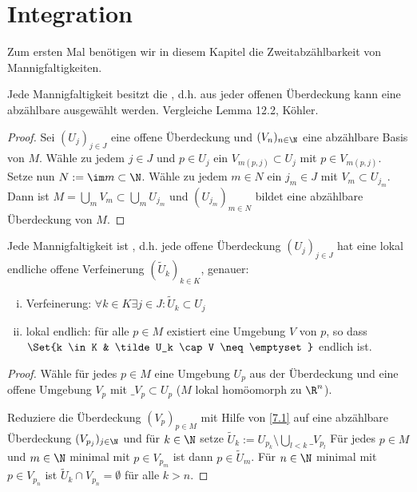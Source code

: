 \chapter{Integration}



Zum ersten Mal benötigen wir in diesem Kapitel die Zweitabzählbarkeit von Mannigfaltigkeiten.

\begin{lem} \label{7.1}
    Jede Mannigfaltigkeit besitzt die , d.h. aus jeder offenen Überdeckung kann eine abzählbare ausgewählt werden.
    Vergleiche Lemma 12.2, Köhler.
    \begin{proof}
        Sei $(U_j)_{j \in J}$ eine offene Überdeckung und $(V_n)_{n \in \N}$ eine abzählbare Basis von $M$.
        Wähle zu jedem $j \in J$ und $p \in U_j$ ein $V_{m(p,j)} \subset U_j$ mit $p \in V_{m(p,j)}$.
        Setze nun $N := \im m \subset \N$.
        Wähle zu jedem $m \in N$ ein $j_m \in J$ mit $V_m \subset U_{j_m}$.
        Dann ist $M = \bigcup_m V_m \subset \bigcup_m U_{j_m}$ und $(U_{j_m})_{m \in N}$ bildet eine abzählbare Überdeckung von $M$.
    \end{proof}
\end{lem}

\begin{lem} \label{7.2}
    Jede Mannigfaltigkeit ist , d.h. jede offene Überdeckung $(U_j)_{j \in J}$ hat eine lokal endliche offene Verfeinerung $(\tilde U_k)_{k \in K}$, genauer:
    \begin{enumerate}[(i)]
        \item
            Verfeinerung: $\forall k \in K \exists j \in J : \tilde U_k \subset U_j$
        \item
            lokal endlich: für alle $p \in M$ existiert eine Umgebung $V$ von $p$, so dass
            \begin{math}
                \Set{k \in K & \tilde U_k \cap V \neq \emptyset}
            \end{math}
            endlich ist.
    \end{enumerate}
    \begin{proof}
        Wähle für jedes $p \in M$ eine Umgebung $U_p$ aus der Überdeckung und eine offene Umgebung $V_p$ mit $\_{V_p} \subset U_p$ ($M$ lokal homöomorph zu $\R^n$).

        Reduziere die Überdeckung $(V_p)_{p \in M}$ mit Hilfe von \ref{7.1} auf eine abzählbare Überdeckung $(V_{p_j})_{j \in \N}$ und für $k \in \N$ setze
        \begin{math}
            \tilde U_k := U_{p_k} \setminus \bigcup_{l < k} \_{V_{p_l}}
        \end{math}
        Für jedes $p \in M$ und $m \in \N$ minimal mit $p \in V_{p_m}$ ist dann $p \in \tilde U_m$.
        Für $n \in \N$ minimal mit $p \in V_{p_n}$ ist $\tilde U_k \cap V_{p_n} = \emptyset$ für alle $k > n$.
    \end{proof}
\end{lem}

